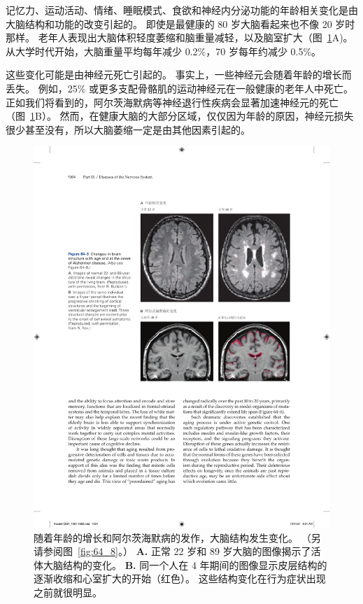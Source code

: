 记忆力、运动活动、情绪、睡眠模式、食欲和神经内分泌功能的年龄相关变化是由大脑结构和功能的改变引起的。
即使是最健康的 80 岁大脑看起来也不像 20 岁时那样。
老年人表现出大脑体积轻度萎缩和脑重量减轻，以及脑室扩大（图~\ref{fig:64_3}A)。
从大学时代开始，大脑重量平均每年减少 0.2\%，70 岁每年约减少 0.5\%。


这些变化可能是由神经元死亡引起的。
事实上，一些神经元会随着年龄的增长而丢失。
例如，25\% 或更多支配骨骼肌的运动神经元在一般健康的老年人中死亡。
正如我们将看到的，阿尔茨海默病等神经退行性疾病会显著加速神经元的死亡（图~\ref{fig:64_3}B）。
然而，在健康大脑的大部分区域，仅仅因为年龄的原因，神经元损失很少甚至没有，所以大脑萎缩一定是由其他因素引起的。


\begin{figure}[htbp]
	\centering
	\includegraphics[width=0.91\linewidth]{chap64/fig_64_3}
	\caption{随着年龄的增长和阿尔茨海默病的发作，大脑结构发生变化。
		（另请参阅图~\ref{fig:64_8}。）
		\textbf{A.} 正常 22 岁和 89 岁大脑的图像揭示了活体大脑结构的变化。
		\textbf{B.} 同一个人在 4 年期间的图像显示皮层结构的逐渐收缩和心室扩大的开始（红色）。
		这些结构变化在行为症状出现之前就很明显。}
	\label{fig:64_3}
\end{figure}


